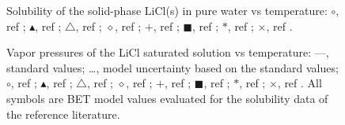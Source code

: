 \documentclass[11pt]{article}
\begin{document}
\begin{figure}[htbp]
\centering
\caption{Solubility of the solid-phase LiCl(s) in pure water vs temperature:
$\circ$, ref ; $\blacktriangle$, ref ;
$\triangle$, ref ; $\diamond$, ref ; $+$,
ref ; $\blacksquare$, ref ; $*$,
ref ; $\times$, ref .}
\end{figure}

\begin{figure}[htbp]
\centering
\caption{Vapor pressures of the LiCl saturated solution vs temperature:
---, standard values; \ldots, model uncertainty based on the standard values;
$\circ$, ref ; $\blacktriangle$, ref ;
$\triangle$, ref ; $\diamond$, ref ; $+$,
ref ; $\blacksquare$, ref ; $*$,
ref ; $\times$, ref . All symbols are BET model
values evaluated for the solubility data of the reference literature.}
\end{figure}
\end{document}
